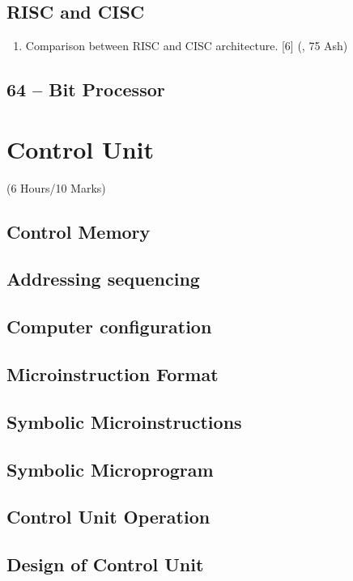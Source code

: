 \documentclass[12pt]{article}
\begin{document}
\subsection{RISC and CISC}
\begin{enumerate}[noitemsep, topsep = 0pt]
	\item Comparison between RISC and CISC architecture. \hfill [6] (, 75 Ash)
\end{enumerate}
\subsection{64 – Bit Processor}

\pagebreak
\section{Control Unit}
\begin{center}(6 Hours/10 Marks)\end{center} 
\subsection{Control Memory}
\subsection{Addressing sequencing}
\subsection{Computer configuration}
\subsection{Microinstruction Format}
\subsection{Symbolic Microinstructions}
\subsection{Symbolic Microprogram}
\subsection{Control Unit Operation}
\subsection{Design of Control Unit}
\end{document}
